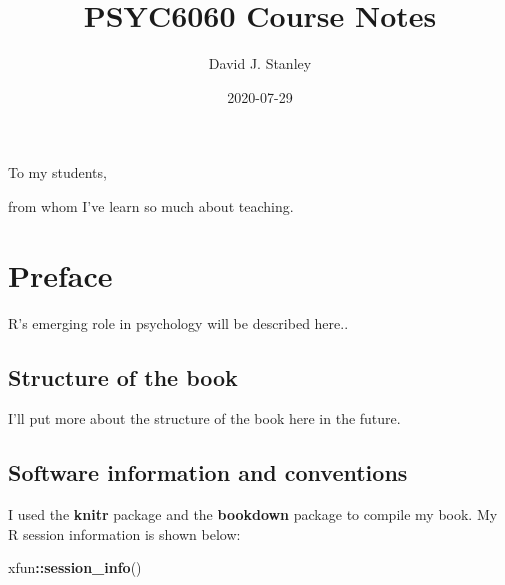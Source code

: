 \documentclass[
]{krantz}
\title{PSYC6060 Course Notes}
\author{David J. Stanley}
\date{2020-07-29}
\makeatletter
\newenvironment{Shaded}{\begin{snugshade}}{\end{snugshade}}
\newcommand{\KeywordTok}[1]{\textcolor[rgb]{0.27,0.27,0.27}{\textbf{#1}}}
\newcommand{\NormalTok}[1]{#1}
\newcommand{\OperatorTok}[1]{\textcolor[rgb]{0.43,0.43,0.43}{\textbf{#1}}}
\newenvironment{kframe}{%
\medskip{}
\setlength{\fboxsep}{.8em}
 \def\at@end@of@kframe{}%
 \ifinner\ifhmode%
  \def\at@end@of@kframe{\end{minipage}}%
  \begin{minipage}{\columnwidth}%
 \fi\fi%
 \def\FrameCommand##1{\hskip\@totalleftmargin \hskip-\fboxsep
 \colorbox{shadecolor}{##1}\hskip-\fboxsep
     \hskip-\linewidth \hskip-\@totalleftmargin \hskip\columnwidth}%
 \MakeFramed {\advance\hsize-\width
   \@totalleftmargin\z@ \linewidth\hsize
   \@setminipage}}%
 {\par\unskip\endMakeFramed%
 \at@end@of@kframe}
\renewenvironment{Shaded}{\begin{kframe}}{\end{kframe}}
\makeatother
\begin{document}
\maketitle


\thispagestyle{empty}

\begin{center}
To my students,

from whom I've learn so much about teaching.
\end{center}

\setlength{\abovedisplayskip}{-5pt}
\setlength{\abovedisplayshortskip}{-5pt}

{
\hypersetup{linkcolor=}
\setcounter{tocdepth}{2}
\tableofcontents
}
\listoftables
\listoffigures
\hypertarget{preface}{%
\chapter*{Preface}\label{preface}}


R's emerging role in psychology will be described here..

\hypertarget{structure-of-the-book}{%
\section*{Structure of the book}\label{structure-of-the-book}}


I'll put more about the structure of the book here in the future.

\hypertarget{software-information-and-conventions}{%
\section*{Software information and conventions}\label{software-information-and-conventions}}


I used the \textbf{knitr} package \citep{xie2015} and the \textbf{bookdown} package \citep{R-bookdown} to compile my book. My R session information is shown below:

\begin{Shaded}
\begin{Highlighting}[]
\NormalTok{xfun}\OperatorTok{::}\KeywordTok{session_info}\NormalTok{()}
\end{Highlighting}
\end{Shaded}
\end{document}
